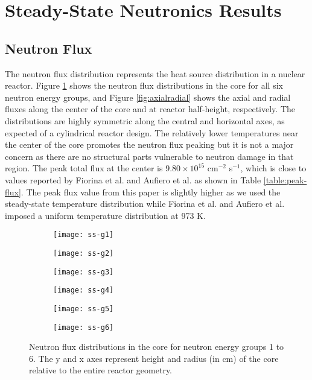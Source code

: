 \section{Steady-State Neutronics Results}

\subsection{Neutron Flux}

The neutron flux distribution represents the heat source distribution in a
nuclear reactor. Figure \ref{fig:neutronflux} shows the neutron flux
distributions in the core for all six neutron energy groups, and Figure
\ref{fig:axialradial} shows the axial and radial fluxes along the center of
the core and at reactor half-height, respectively.
The distributions are highly symmetric along the
central and horizontal axes, as expected of a cylindrical reactor design. The
relatively lower temperatures near the center of the core promotes the neutron
flux peaking but it is not a major concern as there are no structural parts
vulnerable to neutron damage in that region. The peak total flux at the center
is $9.80 \times 10^{15}$ cm$^{-2}$ s$^{-1}$, which is close to values reported
by Fiorina et al. \cite{fiorina_molten_2013} and Aufiero et al.
\cite{aufiero_development_2014} as shown in Table \ref{table:peak-flux}. The
peak flux value from this paper is slightly higher as we used the steady-state
temperature distribution while Fiorina et al. and Aufiero et al. imposed a
uniform temperature distribution at 973 K.

\begin{figure}[b!]
    \centering
    \begin{subfigure}[t]{.325\textwidth}
        \centering
        \texttt{[image: ss-g1]}
    \end{subfigure}
    \begin{subfigure}[t]{.325\textwidth}
        \centering
        \texttt{[image: ss-g2]}
    \end{subfigure}
    \begin{subfigure}[t]{.325\textwidth}
        \centering
        \texttt{[image: ss-g3]}
    \end{subfigure}
    \begin{subfigure}[t]{.325\textwidth}
        \centering
        \texttt{[image: ss-g4]}
    \end{subfigure}
    \begin{subfigure}[t]{.325\textwidth}
        \centering
        \texttt{[image: ss-g5]}
    \end{subfigure}
    \begin{subfigure}[t]{.325\textwidth}
        \centering
        \texttt{[image: ss-g6]}
    \end{subfigure}
    \caption{Neutron flux distributions in the core for neutron energy groups
    1 to 6. The y and x axes represent height and radius (in cm) of the core
    relative to the entire reactor geometry.}
    \label{fig:neutronflux}
\end{figure}

